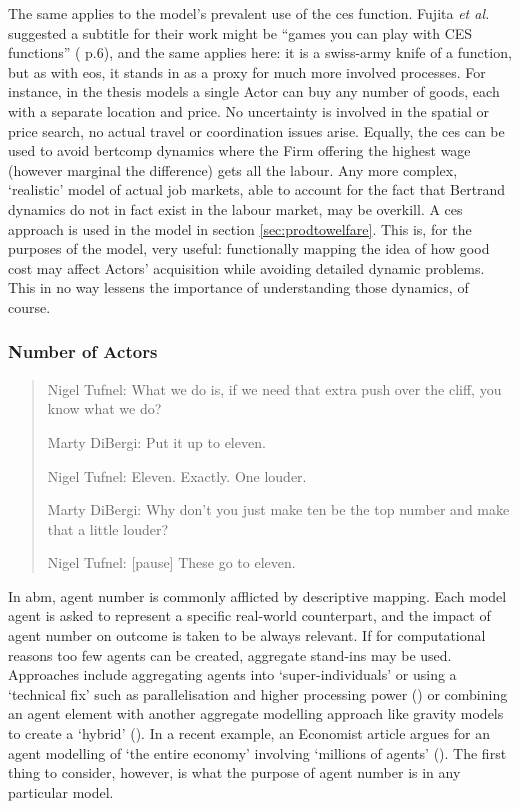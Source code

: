 {The same applies to the model's prevalent use of the \gls{ces} function. Fujita \emph{et al.} suggested a subtitle for their work might be ``games you can play with CES functions'' (\citealt{fujita_spatial_2001} p.6), and the same applies here: it is a swiss-army knife of a function, but as with \gls{eos}, it stands in as a proxy for much more involved processes. For instance, in the thesis models a single Actor can buy any number of goods, each with a separate location and price. No uncertainty is involved in the spatial or price search, no actual travel or coordination issues arise. Equally, the \gls{ces} can be used to avoid \gls{bertcomp} dynamics where the Firm offering the highest wage (however marginal the difference) gets all the labour. Any more complex, `realistic' model of actual job markets, able to account for the fact that Bertrand dynamics do not in fact exist in the labour market, may be overkill. A \gls{ces} approach is used in the model in section \ref{sec:prodtowelfare}. This is, for the purposes of the model, very useful: functionally mapping the idea of how good cost may affect Actors' acquisition while avoiding detailed dynamic problems. This in no way lessens the importance of understanding those dynamics, of course.

\subsubsection{Number of Actors \label{sec:agentnumbers}}

\begin{quote}
Nigel Tufnel: What we do is, if we need that extra push over the cliff, you know what we do?

Marty DiBergi: Put it up to eleven.

Nigel Tufnel: Eleven. Exactly. One louder.

Marty DiBergi: Why don't you just make ten be the top number and make that a little louder?

Nigel Tufnel: [pause] These go to eleven.
\end{quote}
\hspace*{10cm}\emph{\citealt{reiner_this_1984}}
\vspace{1cm}

In \gls{abm}, agent number is commonly afflicted by descriptive mapping. Each model agent is asked to represent a specific real-world counterpart, and the impact of agent number on outcome is taken to be always relevant. If for computational reasons too few agents can be created, aggregate stand-ins may be used. Approaches include aggregating agents into `super-individuals' or using a `technical fix' such as parallelisation and higher processing power (\citealt{parry_comparative_2008}) or combining an agent element with another aggregate modelling approach like gravity models to create a `hybrid' (\citealt{heppenstall_hybrid_2005}). In a recent example, an Economist article argues for an agent modelling of `the entire economy' involving `millions of agents' (\citealt{economist_new_2013}). The first thing to consider, however, is what the purpose of agent number is in any particular model.

}
